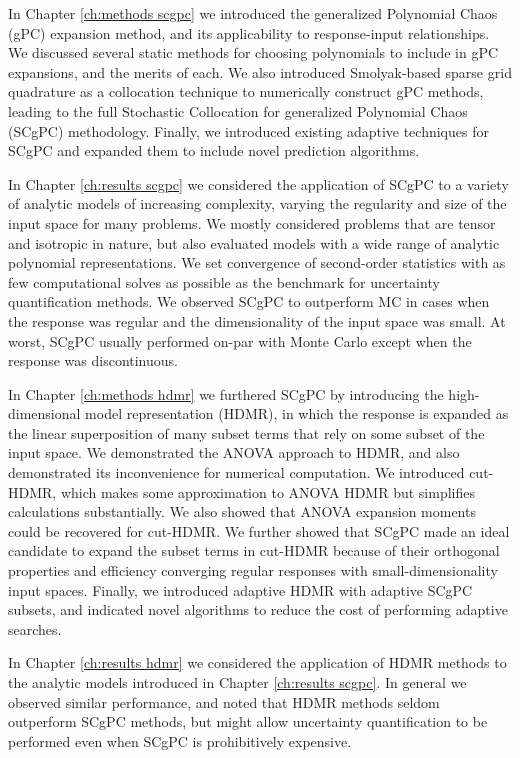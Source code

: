 In Chapter \ref{ch:methods scgpc} we introduced the generalized Polynomial Chaos (gPC) expansion method, and its
applicability to response-input relationships.  We discussed several static methods for choosing polynomials
to include in gPC expansions, and the merits of each.  We also introduced Smolyak-based sparse grid quadrature
as a collocation technique to numerically construct gPC methods, leading to the full Stochastic Collocation
for generalized Polynomial Chaos (SCgPC) methodology.
Finally, we introduced existing adaptive techniques for SCgPC and expanded them to include novel prediction
algorithms.

In Chapter \ref{ch:results scgpc} we considered the application of SCgPC to a variety of analytic models of
increasing complexity, varying the regularity and size of the input space for many problems.  We mostly
considered problems that are tensor and isotropic in nature, but also evaluated models with a wide range of
analytic polynomial representations.  We set convergence of second-order statistics with as few computational
solves as possible as the benchmark for uncertainty quantification methods.  We observed SCgPC to outperform
MC in cases when the response was regular and the dimensionality of the input space was small.  At worst,
SCgPC usually performed on-par with Monte Carlo except when the response was discontinuous.

In Chapter \ref{ch:methods hdmr} we furthered SCgPC by introducing the high-dimensional model representation
(HDMR),
in which the response is expanded as the linear superposition of many subset terms that rely on some subset of
the input space.  We demonstrated the ANOVA approach to HDMR, and also demonstrated its inconvenience for
numerical computation.  We introduced cut-HDMR, which makes some approximation to ANOVA HDMR but simplifies
calculations substantially.  We also showed that ANOVA expansion moments could be recovered for cut-HDMR.  We
further showed that SCgPC made an ideal candidate to expand the subset terms in cut-HDMR because of their
orthogonal properties and efficiency converging regular responses with small-dimensionality input spaces.
Finally, we introduced adaptive HDMR with adaptive SCgPC subsets, and indicated novel algorithms to reduce the
cost of performing adaptive searches.

In Chapter \ref{ch:results hdmr} we considered the application of HDMR methods to the analytic models
introduced in Chapter \ref{ch:results scgpc}.  In general we observed similar performance, and noted that HDMR
methods seldom outperform SCgPC methods, but might allow uncertainty quantification to be performed even when
SCgPC is prohibitively expensive.

